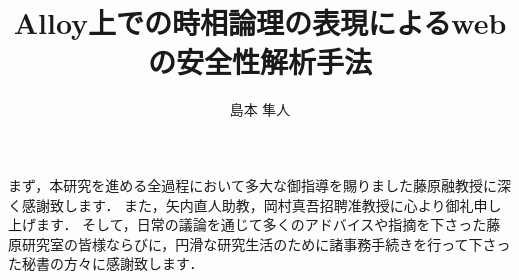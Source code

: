 \documentclass[12pt,a4paper]{jbook}
\title{Alloy上での時相論理の表現によるwebの安全性解析手法}
\author{島本 隼人}
\begin{document}
\coverpage
\tableofcontents
\listoffigures
\listoftables
\body









\acknowledgement
まず，本研究を進める全過程において多大な御指導を賜りました藤原融教授に深く感謝致します．
また，矢内直人助教，岡村真吾招聘准教授に心より御礼申し上げます．
そして，日常の議論を通じて多くのアドバイスや指摘を下さった藤原研究室の皆様ならびに，円滑な研究生活のために諸事務手続きを行って下さった秘書の方々に感謝致します．


 
\end{document}
